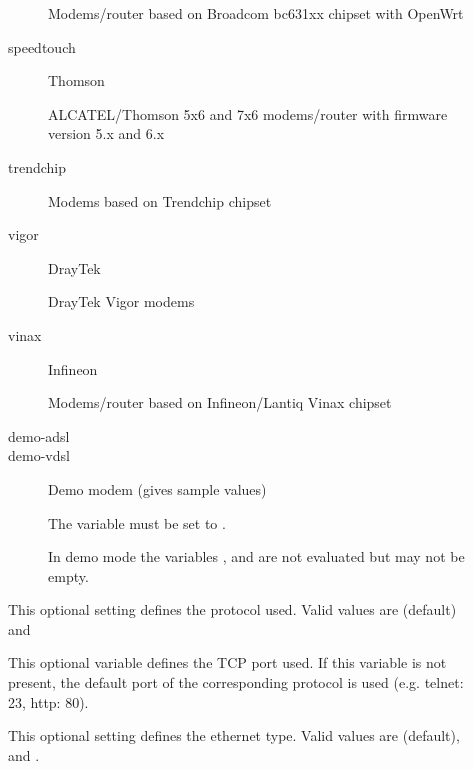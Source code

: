 \begin{description}
\begin{description}
  Modems/router based on Broadcom bc631xx chipset with OpenWrt

\item[speedtouch] Thomson 

  ALCATEL/Thomson 5x6 and 7x6 modems/router with firmware version 5.x and 6.x

\item[trendchip] 

  Modems based on Trendchip chipset

\item[vigor] DrayTek 

  DrayTek Vigor modems

\item[vinax] Infineon 

  Modems/router based on Infineon/Lantiq Vinax chipset

\item[demo-adsl]
\item[demo-vdsl] Demo modem (gives sample values)


  The variable 
  must be set to .

  In demo mode the variables ,
   and
   are not evaluated
  but may not be empty.
\end{description}


  This optional setting defines the protocol used.
  Valid values are  (default) and  


  This optional variable defines the TCP port used.
  If this variable is not present, the default port of the corresponding 
  protocol is used (e.g. telnet: 23, http: 80). 
  

  This optional setting defines the ethernet type.
  Valid values are  (default),  and .




\end{description}
